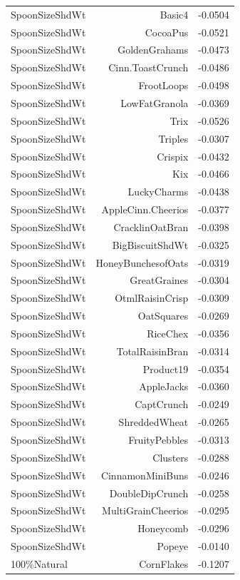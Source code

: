 \begin{longtable}{@{}lrr@{}}
SpoonSizeShdWt & Basic4 & -0.0504 \\
SpoonSizeShdWt & CocoaPus & -0.0521 \\
SpoonSizeShdWt & GoldenGrahams & -0.0473 \\
SpoonSizeShdWt & Cinn.ToastCrunch & -0.0486 \\
SpoonSizeShdWt & FrootLoops & -0.0498 \\
SpoonSizeShdWt & LowFatGranola & -0.0369 \\
SpoonSizeShdWt & Trix & -0.0526 \\
SpoonSizeShdWt & Triples & -0.0307 \\
SpoonSizeShdWt & Crispix & -0.0432 \\
SpoonSizeShdWt & Kix & -0.0466 \\
SpoonSizeShdWt & LuckyCharms & -0.0438 \\
SpoonSizeShdWt & AppleCinn.Cheerios & -0.0377 \\
SpoonSizeShdWt & CracklinOatBran & -0.0398 \\
SpoonSizeShdWt & BigBiscuitShdWt & -0.0325 \\
SpoonSizeShdWt & HoneyBunchesofOats & -0.0319 \\
SpoonSizeShdWt & GreatGraines & -0.0304 \\
SpoonSizeShdWt & OtmlRaisinCrisp & -0.0309 \\
SpoonSizeShdWt & OatSquares & -0.0269 \\
SpoonSizeShdWt & RiceChex & -0.0356 \\
SpoonSizeShdWt & TotalRaisinBran & -0.0314 \\
SpoonSizeShdWt & Product19 & -0.0354 \\
SpoonSizeShdWt & AppleJacks & -0.0360 \\
SpoonSizeShdWt & CaptCrunch & -0.0249 \\
SpoonSizeShdWt & ShreddedWheat & -0.0265 \\
SpoonSizeShdWt & FruityPebbles & -0.0313 \\
SpoonSizeShdWt & Clusters & -0.0288 \\
SpoonSizeShdWt & CinnamonMiniBuns & -0.0246 \\
SpoonSizeShdWt & DoubleDipCrunch & -0.0258 \\
SpoonSizeShdWt & MultiGrainCheerios & -0.0295 \\
SpoonSizeShdWt & Honeycomb & -0.0296 \\
SpoonSizeShdWt & Popeye & -0.0140 \\
100\%Natural & CornFlakes & -0.1207 \\

\end{longtable}
